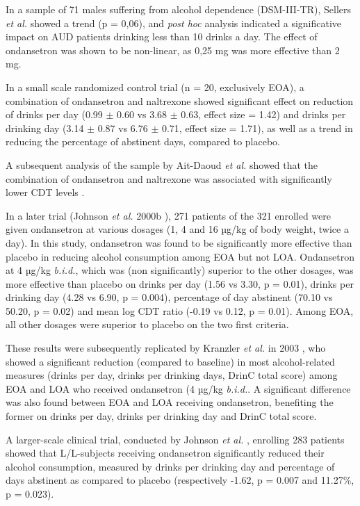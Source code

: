 In a sample of 71 males suffering from alcohol dependence (DSM-III-TR), Sellers \textit{et al.} \cite{sellers_clinical_1994} showed a trend (p = 0,06), and \textit{post hoc} analysis indicated a significative impact on AUD patients drinking less than 10 drinks a day. The effect of ondansetron was shown to be non-linear, as 0,25 mg was more effective than 2 mg.

In a small scale randomized control trial \cite{johnson_combining_2000} (n = 20, exclusively EOA), a combination of ondansetron and naltrexone showed significant effect on reduction of drinks per day (0.99 $\pm$ 0.60 vs 3.68 $\pm$ 0.63, effect size = 1.42) and drinks per drinking day (3.14 $\pm$ 0.87 vs 6.76 $\pm$ 0.71, effect size = 1.71), as well as a trend in reducing the percentage of abstinent days, compared to placebo.

A subsequent analysis of the sample by Ait-Daoud \textit{et al.} showed that the combination of ondansetron and naltrexone was associated with significantly lower CDT levels \cite{ait-daoud_combining_2001-1}.

In a later trial (Johnson \textit{et al.} 2000b \cite{johnson_ondansetron_2000}), 271 patients of the 321 enrolled were given ondansetron at various dosages (1, 4 and 16 µg/kg of body weight, twice a day). In this study, ondansetron was found to be significantly more effective than placebo in reducing alcohol consumption among EOA but not LOA. Ondansetron at 4 µg/kg \emph{b.i.d.}, which was (non significantly) superior to the other dosages, was more effective than placebo on drinks per day (1.56 vs 3.30, p = 0.01), drinks per drinking day (4.28 vs 6.90, p = 0.004), percentage of day abstinent (70.10 vs 50.20, p = 0.02) and mean log CDT ratio (-0.19 vs 0.12, p = 0.01). Among EOA, all other dosages were superior to placebo on the two first criteria.

These results were subsequently replicated by Kranzler \textit{et al.} in 2003 \cite{kranzler_effects_2003}, who showed a significant reduction (compared to baseline) in most alcohol-related measures (drinks per day, drinks per drinking days, DrinC total score) among EOA and LOA who received ondansetron (4 µg/kg \emph{b.i.d.}. A significant difference was also found between EOA and LOA receiving ondansetron, benefiting the former on drinks per day, drinks per drinking day and DrinC total score. 

A larger-scale clinical trial, conducted by Johnson \textit{et al.} \cite{johnson_pharmacogenetic_2011}, enrolling 283 patients  showed that L/L-subjects receiving ondansetron significantly reduced their alcohol consumption, measured by drinks per drinking day and percentage of days abstinent as compared to placebo (respectively -1.62, p = 0.007 and 11.27\%, p = 0.023).


